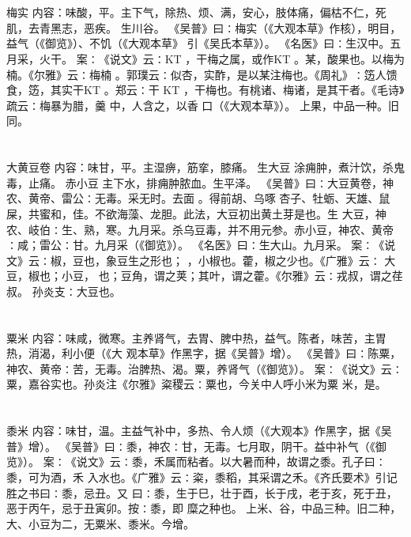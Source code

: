 \documentclass[12pt,UTF8]{ctexbook}
\begin{document}
\section{}梅实
内容：味酸，平。主下气，除热、烦、满，安心，肢体痛，偏枯不仁，死肌，去青黑志，恶疾。 
生川谷。 
《吴普》曰∶梅实（《大观本草》作核），明目，益气（《御览》）、不饥（《大观本草》 
引《吴氏本草》）。 
《名医》曰∶生汉中。五月采，火干。 
案∶《说文》云∶KT ，干梅之属，或作KT 。某，酸果也。以梅为楠。《尔雅》云∶梅楠 
。郭璞云∶似杏，实酢，是以某注梅也。《周礼》∶笾人馈食，笾，其实干KT 。郑云∶干 
KT 
，干梅也。有桃诸、梅诸，是其干者。《毛诗》疏云∶梅暴为腊，羹 中，人含之，以香 
口（《大观本草》）。 
上果，中品一种。旧同。 


\section{}大黄豆卷
内容：味甘，平。主湿痹，筋挛，膝痛。 
生大豆 涂痈肿，煮汁饮，杀鬼毒，止痛。 
赤小豆 主下水，排痈肿脓血。生平泽。 
《吴普》曰∶大豆黄卷，神农、黄帝、雷公∶无毒。采无时。去面 。得前胡、乌啄 
杏子、牡蛎、天雄、鼠屎，共蜜和，佳。不欲海藻、龙胆。此法，大豆初出黄土芽是也。生 
大豆，神农、岐伯∶生、熟，寒。九月采。杀乌豆毒，并不用元参。赤小豆，神农、黄帝 
∶咸；雷公∶甘。九月采（《御览》）。 
《名医》曰∶生大山。九月采。 
案∶《说文》云∶椒，豆也，象豆生之形也； ，小椒也。藿，椒之少也。《广雅》云∶ 
大豆，椒也；小豆， 也；豆角，谓之荚；其叶，谓之藿。《尔雅》云∶戎叔，谓之荏叔。 
孙炎支∶大豆也。 


\section{}粟米
内容：味咸，微寒。主养肾气，去胃、脾中热，益气。陈者，味苦，主胃热，消渴，利小便（《大 
观本草》作黑字，据《吴普》增）。 
《吴普》曰∶陈粟，神农、黄帝∶苦，无毒。治脾热、渴。粟，养肾气（《御览》）。 
案∶《说文》云∶粟，嘉谷实也。孙炎注《尔雅》粢稷云∶粟也，今关中人呼小米为粟 
米，是。 


\section{}黍米
内容：味甘，温。主益气补中，多热、令人烦（《大观本》作黑字，据《吴普》增）。 
《吴普》曰∶黍，神农∶甘，无毒。七月取，阴干。益中补气（《御览》）。 
案∶《说文》云∶黍，禾属而粘者。以大暑而种，故谓之黍。孔子曰∶黍，可为酒，禾 
入水也。《广雅》云∶粢，黍稻，其采谓之禾。《齐氏要术》引记胜之书曰∶黍，忌丑。又 
曰∶黍，生于巳，壮于酉，长于戌，老于亥，死于丑，恶于丙午，忌于丑寅卯。按∶黍，即 
糜之种也。 
上米、谷，中品三种。旧二种，大、小豆为二，无粟米、黍米。今增。 
\end{document}
